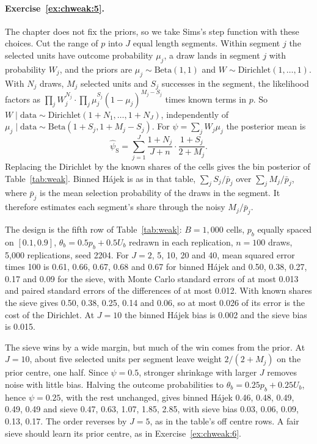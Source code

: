 \paragraph{Exercise~\ref{ex:chweak:5}.} The chapter does not fix the priors, so we take Sims's step function with these choices. Cut the range of $p$ into $J$ equal length segments. Within segment $j$ the selected units have outcome probability $\mu_j$, a draw lands in segment $j$ with probability $W_j$, and the priors are $\mu_j \sim \mathrm{Beta}(1, 1)$ and $W \sim \mathrm{Dirichlet}(1, \ldots, 1)$. With $N_j$ draws, $M_j$ selected units and $S_j$ successes in the segment, the likelihood factors as $\prod_jW_j^{N_j}\cdot\prod_j\mu_j^{S_j}(1 - \mu_j)^{M_j - S_j}$ times known terms in $p$. So $W \mid \text{data} \sim \mathrm{Dirichlet}(1 + N_1, \ldots, 1 + N_J)$, independently of $\mu_j \mid \text{data} \sim \mathrm{Beta}(1 + S_j, 1 + M_j - S_j)$. For $\psi = \sum_jW_j\mu_j$ the posterior mean is
\[
\hat\psi_{\mathrm{S}} = \sum_{j=1}^J\frac{1 + N_j}{J + n}\cdot\frac{1 + S_j}{2 + M_j}.
\]
Replacing the Dirichlet by the known shares of the cells gives the bin posterior of Table~\ref{tab:weak}. Binned H\'ajek is as in that table, $\sum_jS_j/\bar p_j$ over $\sum_jM_j/\bar p_j$, where $\bar p_j$ is the mean selection probability of the draws in the segment. It therefore estimates each segment's share through the noisy $M_j/\bar p_j$.

The design is the fifth row of Table~\ref{tab:weak}: $B = 1{,}000$ cells, $p_b$ equally spaced on $[0.1, 0.9]$, $\theta_b = 0.5p_b + 0.5U_b$ redrawn in each replication, $n = 100$ draws, 5,000 replications, seed 2204. For $J = 2$, 5, 10, 20 and 40, mean squared error times 100 is 0.61, 0.66, 0.67, 0.68 and 0.67 for binned H\'ajek and 0.50, 0.38, 0.27, 0.17 and 0.09 for the sieve, with Monte Carlo standard errors of at most 0.013 and paired standard errors of the differences of at most 0.012. With known shares the sieve gives 0.50, 0.38, 0.25, 0.14 and 0.06, so at most 0.026 of its error is the cost of the Dirichlet. At $J = 10$ the binned H\'ajek bias is 0.002 and the sieve bias is 0.015.

The sieve wins by a wide margin, but much of the win comes from the prior. At $J=10$, about five selected units per segment leave weight $2/(2+M_j)$ on the prior centre, one half. Since $\psi=0.5$, stronger shrinkage with larger $J$ removes noise with little bias. Halving the outcome probabilities to $\theta_b=0.25p_b+0.25U_b$, hence $\psi=0.25$, with the rest unchanged, gives binned H\'ajek 0.46, 0.48, 0.49, 0.49, 0.49 and sieve 0.47, 0.63, 1.07, 1.85, 2.85, with sieve bias 0.03, 0.06, 0.09, 0.13, 0.17. The order reverses by $J=5$, as in the table's off centre rows. A fair sieve should learn its prior centre, as in Exercise~\ref{ex:chweak:6}.

